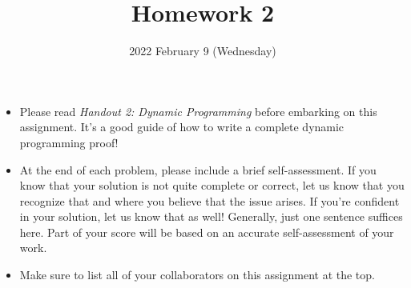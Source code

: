 \documentclass{ks-pset}
\title{Homework 2}
\author{}
\date{2022 February 9 (Wednesday)}
\begin{document}
\begin{itemize}
  \item Please read \emph{Handout 2:  Dynamic Programming} before embarking on
    this assignment.  It's a good guide of how to write a complete dynamic
    programming proof!
  \item At the end of each problem, please include a brief self-assessment. If
    you know that your solution is not quite complete or correct, let us know
    that you recognize that and where you believe that the issue arises. If
    you're confident in your solution, let us know that as well! Generally,
    just one sentence suffices here. Part of your score will be based on an
    accurate self-assessment of your work.
  \item Make sure to list all of your collaborators on this assignment at the
    top.
\end{itemize}

\newpage
\end{document}
